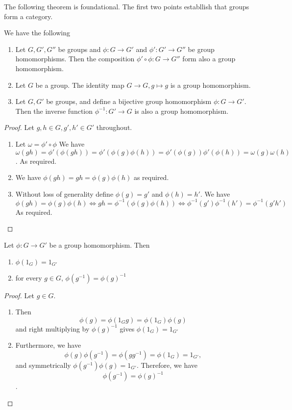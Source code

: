 The following theorem is foundational. The first two points establlish that groups form a
category. 
\begin{theorem} 
  We have the following
  \begin{enumerate}
    \item Let $G,G',G''$ be groups and $\phi:G\to G'$ and $\phi':G'\to G''$ be group
      homomorphisms. Then the composition $\phi'\circ\phi:G\to G''$ form also a group
      homomorphism.
    \item Let $G$ be a group. The identity map $G\to G,g\mapsto g$ is a group
      homomorphism.
    \item Let $G,G'$ be groups, and define a bijective group homomorphism $\phi:G\to G'$.
      Then the inverse function $\phi^{-1}:G'\to G$ is also a group homomorphism.
  \end{enumerate}
  \label{groupsCategories}
\end{theorem}
\begin{proof}
  Let $g,h\in G, g',h'\in G'$ throughout.
  \begin{enumerate}
    \item Let $\omega = \phi' \circ \phi $ We have $\omega(gh)= \phi'(\phi(gh))=
      \phi'(\phi(g)\phi(h)) =\phi'(\phi(g)) \phi'(\phi(h)) = \omega(g)\omega(h) $. As
      required.
    \item We have $\phi(gh) = gh = \phi(g)\phi(h)$ as required.
    \item Without loss of generality define $\phi(g) = g'$ and $\phi(h) = h'$. We have 
    $\phi(gh) = \phi(g)\phi(h) \iff gh = \phi^{-1}(\phi(g)\phi(h)) \iff \phi^{-1}(g')\phi^{-1}(h') = \phi^{-1}(g'h')$ As required.

  \end{enumerate}
\end{proof}

\begin{theorem}
  Let $\phi:G\to G'$ be a group homomorphism. Then
  \begin{enumerate}
    \item $\phi(1_G)=1_{G'}$
    \item for every $g\in G$, $\phi(g^{-1})= \phi(g)^{-1}$
  \end{enumerate}
  \label{homIdInv}
\end{theorem}
\begin{proof}
Let $g \in G$.
  \begin{enumerate}
    \item Then
    $$\phi(g) = \phi(1_G g) = \phi(1_G)\phi(g)$$
    and right multiplying by $\phi(g)^{-1}$ gives $\phi(1_G) = 1_{G'}$
    \item Furthermore, we have
    $$\phi(g)\phi(g^{-1}) = \phi(gg^{-1}) = \phi(1_G) = 1_{G'},$$
    and symmetrically $\phi(g^{-1})\phi(g) = 1_{G'}.$ Therefore, we have
    $$\phi(g^{-1}) = \phi(g)^{-1}$$.
  \end{enumerate}
\end{proof}


